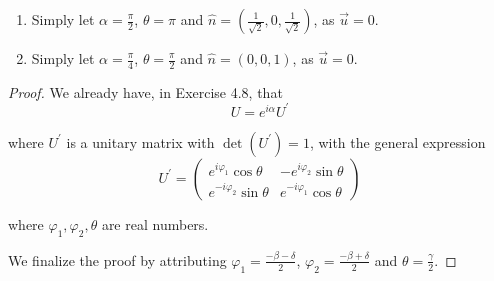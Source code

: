 \documentclass[../main.tex]{subfiles}
\begin{document}
\begin{enumerate}
\begin{proof}
    We see that
    \begin{itemize}
        \item If $\vec{u}=0$, let $\hat{n}=\frac{1}{\sin\frac{\theta}{2}}\vec{v}$, we have
        \begin{equation*}
            U^\prime=\cos\frac{\theta}{2}I+i\sin\frac{\theta}{2}\hat{n}\cdot\vec{\sigma}=R_{\hat{n}}(\theta)
        \end{equation*}
        So that
        \begin{equation*}
            U=e^{i\alpha}R_{\hat{n}}(\theta)
        \end{equation*}
        \item If $\vec{u}\neq0$, we have $\cos{\frac{\theta}{2}}=0$ and $\vec{u}=\pm\vec{v}$. In both cases, we will have
        \begin{equation*}
            \vec{r}=\vec{u}\pm\vec{v}=e^{\pm i\frac{\pi}{4}}\hat{n}
        \end{equation*}
        where $\hat{n}$ is real-valued. Finally, we have
        \begin{equation*}
            U=e^{i\alpha} U^\prime=e^{i(\alpha\pm\frac{\pi}{4})}R_{\hat{n}}(\theta)
        \end{equation*}
    \end{itemize}
    \end{proof}
    
    \item
    Simply let $\alpha=\frac{\pi}{2}$, $\theta=\pi$ and $\hat{n}=(\frac{1}{\sqrt{2}},0,\frac{1}{\sqrt{2}})$, as $\vec{u}=0$.
    
    \item
    Simply let $\alpha=\frac{\pi}{4}$, $\theta=\frac{\pi}{2}$ and $\hat{n}=(0,0,1)$, as $\vec{u}=0$.
\end{enumerate}

\bigskip
\begin{exercise}
\end{exercise}
\begin{proof}
We already have, in Exercise 4.8, that
\begin{equation*}
    U=e^{i\alpha}U^\prime
\end{equation*}

where $U^\prime$ is a unitary matrix with $\det(U^\prime)=1$, with the general expression
\begin{equation*}
    U^\prime = \begin{pmatrix}e^{i\varphi_1}\cos\theta & -e^{i\varphi_2}\sin\theta \\
    e^{-i\varphi_2}\sin\theta & e^{-i\varphi_1}\cos\theta\end{pmatrix}
\end{equation*}

where $\varphi_1, \varphi_2, \theta$ are real numbers.

We finalize the proof by attributing $\varphi_1=\frac{-\beta-\delta}{2}$, $\varphi_2=\frac{-\beta+\delta}{2}$ and $\theta=\frac{\gamma}{2}$.
\end{proof}
\end{document}
